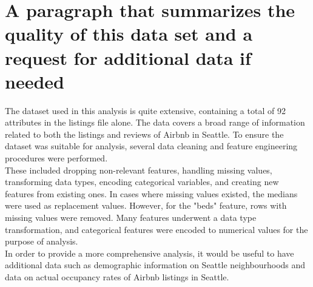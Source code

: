\documentclass{article}
\begin{document}
\section{A paragraph that summarizes the quality of this data set and a request for additional data if needed}
The dataset used in this analysis is quite extensive, containing a total of 92 attributes in the listings file alone. The data covers a broad range of information related to both the listings and reviews of Airbnb in Seattle. To ensure the dataset was suitable for analysis, several data cleaning and feature engineering procedures were performed. \\
These included dropping non-relevant features, handling missing values, transforming data types, encoding categorical variables, and creating new features from existing ones. In cases where missing values existed, the medians were used as replacement values. However, for the "beds" feature, rows with missing values were removed. Many features underwent a data type transformation, and categorical features were encoded to numerical values for the purpose of analysis.\\
In order to provide a more comprehensive analysis, it would be useful to have additional data such as demographic information on Seattle neighbourhoods and data on actual occupancy rates of Airbnb listings in Seattle.
\end{document}
